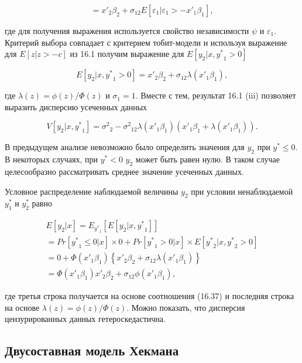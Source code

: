 \[
={x'}_2\beta_2+\sigma_{12}E[\varepsilon_1|\varepsilon_1>-{x'}_1\beta_1],
\]

где для получения выражения используется свойство независимости $\psi$ и $\varepsilon_1$. Критерий выбора совпадает с критерием тобит-модели и используя выражение для $E[z|z>-c]$ из 16.1 получим выражение для $E[y_2|x,{y^{*}}_1>0]$

\begin{equation}
E[y_2|x,{y^{*}}_1>0]={x'}_2\beta_2+\sigma_{12}\lambda({x'}_1\beta_1),
\end{equation}

где $\lambda(z)=\phi(z)/\Phi(z)$ и ${\sigma}_1=1$.  Вместе с тем, результат 16.1 (iii) позволяет выразить дисперсию усеченных данных

\begin{equation}
V[y_2|x,{y^{*}}_1]={\sigma^2}_2-{\sigma^2}_{12}\lambda({x'}_1\beta_1)({x'}_1\beta_1+\lambda({x'}_1\beta_1)).
\end{equation}

В предыдущем анализе невозможно было определить значения для $y_2$ при ${y^{*}}{\leq}0$. В некоторых случаях, при ${y^{*}}<0$ $y_2$ может быть равен нулю. В таком случае целесообразно рассматривать среднее значение усеченных данных. 


Условное распределение наблюдаемой величины $y_2$ при условии ненаблюдаемой $y^{*}_1$ и $y^{*}_2$ равно

\begin{equation}
\begin{split}
E[y_2|x]=E_{{y^{*}}_1}[E[y_2|x,{y^{*}}_1]] \\
=Pr[{y^{*}}_1{\leq}0|x]{\times}0+Pr[{y^{*}}_1>0|x]{\times}E[{y^{*}}_2|x,{y^{*}}_2>0] \\
=0+\Phi({x'}_1\beta_1)\left\lbrace{x'}_2\beta_2+\sigma_{12}\lambda\left({x'}_1\beta_1\right)\right\rbrace \\
=\Phi({x'}_1\beta_1){x'}_2\beta_2+\sigma_{12}\phi({x'}_1\beta_1),
\end{split}
\end{equation}

где третья строка получается на основе соотношения (16.37) и последняя строка на основе $\lambda(z)=\phi(z)/{\Phi}(z)$. Можно показать, что дисперсия цензурированных данных гетероскедастична.


\subsection{Двусоставная модель Хекмана}

